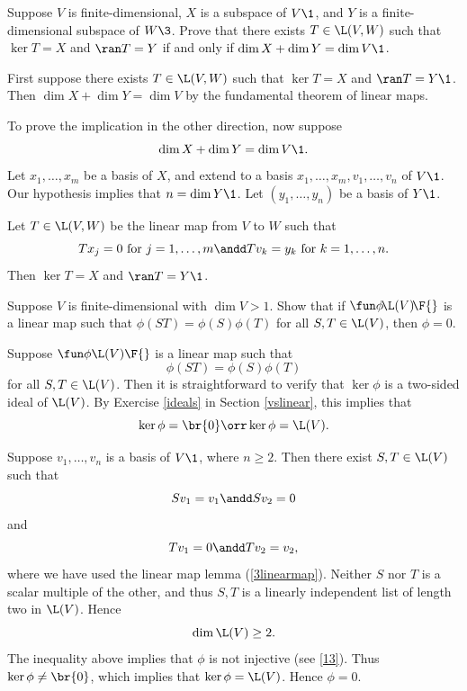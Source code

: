 \exercise
Suppose $V$ is finite-dimensional, $X$ is a subspace of $V\1$, and $Y$ is a finite-dimensional subspace of $W\3$. Prove that there exists $T \in \L(V, W)$ such that $\ker T = X$ and $\ran T = Y$ if and only if
$\dim X + \dim Y = \dim V\1$.

\begin{Solution}
First suppose there exists $T \in \L(V, W)$ such that $\ker T = X$ and $\ran T = Y\1$. Then $\dim X + \dim Y = \dim V$ by the fundamental theorem of linear maps.

To prove the implication in the other direction, now suppose
\[
\dim X + \dim Y = \dim V\1.
\]
Let $x_1, \ldots, x_m$ be a basis of $X$, and extend to a basis $x_1, \ldots, x_m, v_1, \ldots, v_n$ of $V\1$. Our hypothesis implies that $n = \dim Y\1$. Let $(y_1, \ldots, y_n)$ be a basis of $Y\1$.

Let $T \in \L(V, W)$ be the linear map from $V$ to $W$ such that
\[
Tx_j = 0 \text{ for } j = 1, \ldots, m \andd Tv_k = y_k \text{ for } k = 1, \ldots, n.
\]
Then $\ker T = X$ and $\ran T = Y\1$.
\end{Solution}

\exercise
Suppose $V$ is finite-dimensional with $\dim V > 1$. Show that if \mbox{$\fun \phi {\!\L(V)\!} {\F{}}$} is a linear map such that
$
\phi(ST) = \phi(S) \phi(T)
$
for all $S, T \in \L(V)$, then $\phi = 0$.

\begin{Solution}
Suppose $\fun \phi {\L(V)} {\F{}}$ is a linear map such that
\[
\phi(ST) = \phi(S) \phi(T)
\]
for all $S, T \in \L(V)$. Then it is straightforward to verify that $\ker \phi$ is a two-sided ideal of $\L(V)$. By Exercise \ref{ideals} in Section \ref{vslinear}, this implies that
\[
\ker \phi = \br{0} \orr \ker \phi = \L(V).
\]

Suppose $v_1, \dots, v_n$ is a basis of $V\1$, where $n \ge 2$. Then there exist $S, T \in \L(V)$ such that
\[
Sv_1 = v_1 \andd Sv_2 = 0
\]
and
\[
Tv_1 = 0 \andd Tv_2 = v_2,
\]
where we have used the linear map lemma (\ref{3linearmap}). Neither $S$ nor $T$ is a scalar multiple of the other, and thus $S, T$ is a linearly independent list of length two in $\L(V)$. Hence
\[
\dim \L(V) \ge 2.
\]
The inequality above implies that $\phi$ is not injective (see \ref{13}). Thus $\ker \phi \ne \br{0}$, which implies that $\ker \phi = \L(V)$. Hence $\phi = 0$.
\end{Solution}

